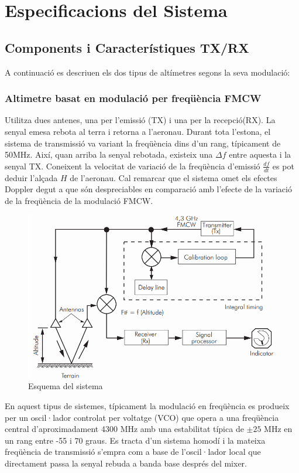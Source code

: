 \chapter{Especificacions del Sistema}
\section{Components i Característiques TX/RX}
A continuació es descriuen els dos tipus de altímetres segons la seva modulació:
\subsection{Altimetre basat en modulació per freqüència FMCW}
Utilitza dues antenes, una per l'emissió (TX) i una per la recepció(RX). La senyal emesa rebota al terra i retorna a l'aeronau. Durant tota l'estona, el sistema de transmissió va variant la freqüència dins d'un rang, típicament de 50MHz. Així, quan arriba la senyal rebotada, existeix una $\Delta f$ entre aquesta i la senyal TX. Coneixent la velocitat de variació de la freqüència d'emissió $\frac{df}{dt}$ es pot deduir l'alçada $H$ de l'aeronau. Cal remarcar que el sistema omet els efectes Doppler degut a que són despreciables en comparació amb l'efecte de la variació de la freqüència de la modulació FMCW.
\begin{figure}[H]
	\centering
	\includegraphics[scale=0.4]{./img/FMCW.png}
	\caption{Esquema del sistema}
\end{figure}

En aquest tipus de sistemes, típicament la modulació en freqüència es produeix per un oscil·lador controlat per voltatge (VCO) que opera a una freqüència central d'aproximadament 4300 MHz amb una estabilitat típica de $\pm 25$ MHz en un rang entre -55 i 70 graus.
Es tracta d'un sistema homodí i la mateixa freqüència de transmissió s'empra com a base de l'oscil·lador local que directament passa la senyal rebuda a banda base després del mixer.

